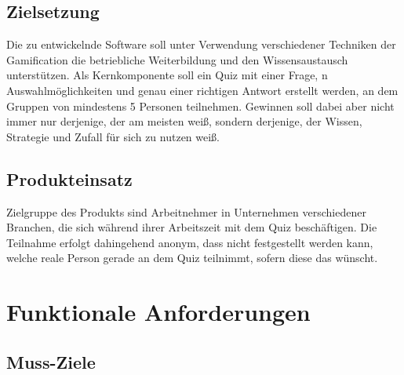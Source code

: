 \documentclass[11pt,a4paper]{scrreprt}
\begin{document}
\section{Zielsetzung}
Die zu entwickelnde Software soll unter Verwendung verschiedener Techniken der Gamification die betriebliche Weiterbildung und den Wissensaustausch unterstützen.
Als Kernkomponente soll ein Quiz mit einer Frage, n Auswahlmöglichkeiten und genau einer richtigen Antwort erstellt werden, an dem Gruppen von mindestens 5 Personen teilnehmen.
Gewinnen soll dabei aber nicht immer nur derjenige, der am meisten weiß, sondern derjenige, der Wissen, Strategie und Zufall für sich zu nutzen weiß.
\section{Produkteinsatz}
Zielgruppe des Produkts sind Arbeitnehmer in Unternehmen verschiedener Branchen, die sich während ihrer Arbeitszeit mit dem Quiz beschäftigen. Die Teilnahme erfolgt dahingehend anonym, dass nicht festgestellt werden kann, welche reale Person gerade an dem Quiz teilnimmt, sofern diese das wünscht.

\chapter{Funktionale Anforderungen}
\section{Muss-Ziele}
\end{document}
